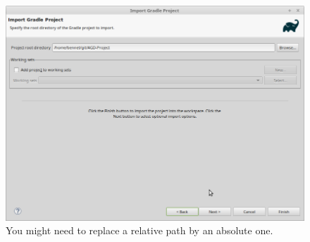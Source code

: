 \begin{figure}
	\includegraphics[width=\textwidth]{setup-parts/pictures/eclipse-import-4b.png}
	\caption{You might need to replace a relative path by an absolute one.}
\end{figure}

